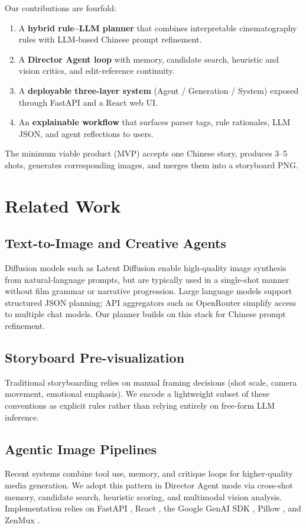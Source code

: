 \documentclass{article}
\begin{document}
Our contributions are fourfold:
\begin{enumerate}[leftmargin=*, itemsep=2pt]
  \item A \textbf{hybrid rule--LLM planner} that combines interpretable cinematography rules with LLM-based Chinese prompt refinement.
  \item A \textbf{Director Agent loop} with memory, candidate search, heuristic and vision critics, and edit-reference continuity.
  \item A \textbf{deployable three-layer system} (Agent / Generation / System) exposed through FastAPI and a React web UI.
  \item An \textbf{explainable workflow} that surfaces parser tags, rule rationales, LLM JSON, and agent reflections to users.
\end{enumerate}

The minimum viable product (MVP) accepts one Chinese story, produces 3--5 shots, generates corresponding images, and merges them into a storyboard PNG.

\section{Related Work}
\label{sec:related}

\subsection{Text-to-Image and Creative Agents}
Diffusion models such as Latent Diffusion \citep{rombach2022high} enable high-quality image synthesis from natural-language prompts, but are typically used in a single-shot manner without film grammar or narrative progression.
Large language models \citep{brown2020language} support structured JSON planning; API aggregators such as OpenRouter \citep{openrouter2024} simplify access to multiple chat models.
Our planner builds on this stack for Chinese prompt refinement.

\subsection{Storyboard Pre-visualization}
Traditional storyboarding relies on manual framing decisions (shot scale, camera movement, emotional emphasis).
We encode a lightweight subset of these conventions as explicit rules rather than relying entirely on free-form LLM inference.

\subsection{Agentic Image Pipelines}
Recent systems combine tool use, memory, and critique loops for higher-quality media generation.
We adopt this pattern in Director Agent mode via cross-shot memory, candidate search, heuristic scoring, and multimodal vision analysis.
Implementation relies on FastAPI \citep{fastapi2024}, React \citep{react2025}, the Google GenAI SDK \citep{googlegenai2025}, Pillow \citep{pillow2025}, and ZenMux \citep{zenmux2025}.
\end{document}
